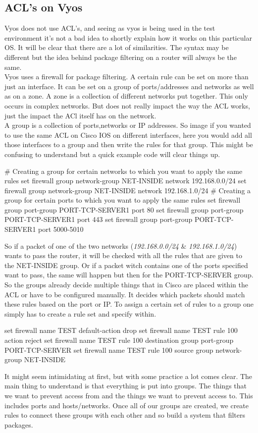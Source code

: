 \subsection{ACL's on Vyos}
Vyos does not use ACL's, and seeing as vyos is being used in the test environment it's not a bad idea to shortly explain how it works on this particular OS. It will be clear that there are a lot of similarities. The syntax may be different but the idea behind package filtering on a router will always be the same.\\
Vyos uses a firewall for package filtering. A certain rule can be set on more than just an interface. It can be set on a group of ports/addresses and networks as well as on a zone.
A zone is a collection of different networks put together. This only occurs in complex networks. But does not really impact the way the ACL works, just the impact the ACl itself has on the network.\\
A group is a collection of ports,networks or IP addresses. So image if you wanted to use the same ACL on Cisco IOS on different interfaces, here you would add all those interfaces to a group and then write the rules for that group. This might be confusing to understand but a quick example code will clear things up.
\begin{cisco}[title=Creating firewall groups]
# Creating a group for certain networks to which you want to apply the same rules
set firewall group network-group NET-INSIDE network 192.168.0.0/24
set firewall group network-group NET-INSIDE network 192.168.1.0/24
# Creating a group for certain ports to which you want to apply the same rules
set firewall group port-group PORT-TCP-SERVER1 port 80
set firewall group port-group PORT-TCP-SERVER1 port 443
set firewall group port-group PORT-TCP-SERVER1 port 5000-5010
\end {cisco}
So if a packet of one of the two networks (\textit{192.168.0.0/24} \& \textit{192.168.1.0/24}) wants to pass the router, it will be checked with all the rules that are given to the NET-INSIDE group. Or if a packet witch contains one of the ports specified want to pass, the same will happen but then for the PORT-TCP-SERVER group. So the groups already decide multiple things that in Cisco are placed within the ACL or have to be configured manually. It decides which packets should match these rules based on the port or IP. To assign a certain set of rules to a group one simply has to create a rule set and specify within.
\begin{cisco}[title=Configuring a rule set]
set firewall name TEST default-action drop
set firewall name TEST rule 100 action reject
set firewall name TEST rule 100 destination group port-group PORT-TCP-SERVER
set firewall name TEST rule 100 source group network-group NET-INSIDE
\end{cisco}
It might seem intimidating at first, but with some practice a lot comes clear. The main thing to understand is that everything is put into groups. The things that we want to prevent access from and the things we want to prevent access to. This includes ports and hosts/networks. Once all of our groups are created, we create rules to connect these groups with each other and so build a system that filters packages.
